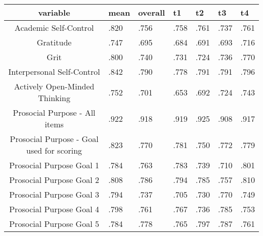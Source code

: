 \captionsetup[table]{labelformat=empty,skip=1pt}
\begin{longtable}{cllllll}
\toprule
variable & mean & overall & t1 & t2 & t3 & t4 \\ 
\midrule
Academic Self-Control & .820 & .756 & .758 & .761 & .737 & .761 \\ 
Gratitude & .747 & .695 & .684 & .691 & .693 & .716 \\ 
Grit & .800 & .740 & .731 & .724 & .736 & .770 \\ 
Interpersonal Self-Control & .842 & .790 & .778 & .791 & .791 & .796 \\ 
Actively Open-Minded Thinking & .752 & .701 & .653 & .692 & .724 & .743 \\ 
Prosocial Purpose - All items & .922 & .918 & .919 & .925 & .908 & .917 \\ 
Prosocial Purpose - Goal used for scoring & .823 & .770 & .781 & .750 & .772 & .779 \\ 
Prosocial Purpose Goal 1  & .784 & .763 & .783 & .739 & .710 & .801 \\ 
Prosocial Purpose Goal 2 & .808 & .786 & .794 & .785 & .757 & .810 \\ 
Prosocial Purpose Goal 3 & .794 & .737 & .705 & .730 & .770 & .749 \\ 
Prosocial Purpose Goal 4 & .798 & .761 & .767 & .736 & .785 & .753 \\ 
Prosocial Purpose Goal 5 & .784 & .778 & .765 & .797 & .787 & .761 \\ 
\bottomrule
\end{longtable}

